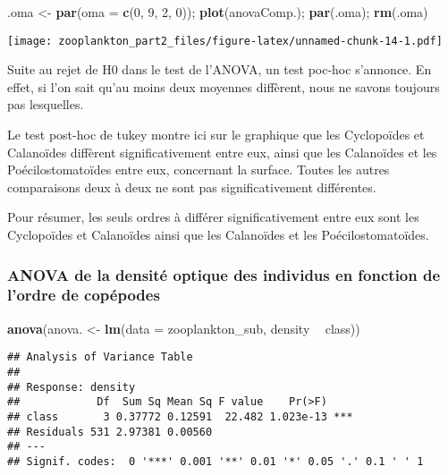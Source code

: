 \documentclass[]{article}
\newenvironment{Shaded}{\begin{snugshade}}{\end{snugshade}}
\newcommand{\KeywordTok}[1]{\textcolor[rgb]{0.13,0.29,0.53}{\textbf{#1}}}
\newcommand{\DataTypeTok}[1]{\textcolor[rgb]{0.13,0.29,0.53}{#1}}
\newcommand{\DecValTok}[1]{\textcolor[rgb]{0.00,0.00,0.81}{#1}}
\newcommand{\StringTok}[1]{\textcolor[rgb]{0.31,0.60,0.02}{#1}}
\newcommand{\OperatorTok}[1]{\textcolor[rgb]{0.81,0.36,0.00}{\textbf{#1}}}
\newcommand{\NormalTok}[1]{#1}
\begin{document}
\begin{Shaded}
\begin{Highlighting}[]
\NormalTok{.oma <-}\StringTok{ }\KeywordTok{par}\NormalTok{(}\DataTypeTok{oma =} \KeywordTok{c}\NormalTok{(}\DecValTok{0}\NormalTok{, }\DecValTok{9}\NormalTok{, }\DecValTok{2}\NormalTok{, }\DecValTok{0}\NormalTok{)); }\KeywordTok{plot}\NormalTok{(anovaComp.); }\KeywordTok{par}\NormalTok{(.oma); }\KeywordTok{rm}\NormalTok{(.oma)}
\end{Highlighting}
\end{Shaded}

\texttt{[image: zooplankton\_part2\_files/figure-latex/unnamed-chunk-14-1.pdf]}

Suite au rejet de H0 dans le test de l'ANOVA, un test poc-hoc s'annonce.
En effet, si l'on sait qu'au moins deux moyennes diffèrent, nous ne
savons toujours pas lesquelles.

Le test post-hoc de tukey montre ici sur le graphique que les
Cyclopoïdes et Calanoïdes diffèrent significativement entre eux, ainsi
que les Calanoïdes et les Poécilostomatoïdes entre eux, concernant la
surface. Toutes les autres comparaisons deux à deux ne sont pas
significativement différentes.

Pour résumer, les seuls ordres à différer significativement entre eux
sont les Cyclopoïdes et Calanoïdes ainsi que les Calanoïdes et les
Poécilostomatoïdes.

\subsubsection{ANOVA de la densité optique des individus en fonction de
l'ordre de
copépodes}\label{anova-de-la-densite-optique-des-individus-en-fonction-de-lordre-de-copepodes}

\begin{Shaded}
\begin{Highlighting}[]
\KeywordTok{anova}\NormalTok{(anova. <-}\StringTok{ }\KeywordTok{lm}\NormalTok{(}\DataTypeTok{data =}\NormalTok{ zooplankton_sub, density }\OperatorTok{~}\StringTok{ }\NormalTok{class))}
\end{Highlighting}
\end{Shaded}

\begin{verbatim}
## Analysis of Variance Table
## 
## Response: density
##            Df  Sum Sq Mean Sq F value    Pr(>F)    
## class       3 0.37772 0.12591  22.482 1.023e-13 ***
## Residuals 531 2.97381 0.00560                      
## ---
## Signif. codes:  0 '***' 0.001 '**' 0.01 '*' 0.05 '.' 0.1 ' ' 1
\end{verbatim}
\end{document}
